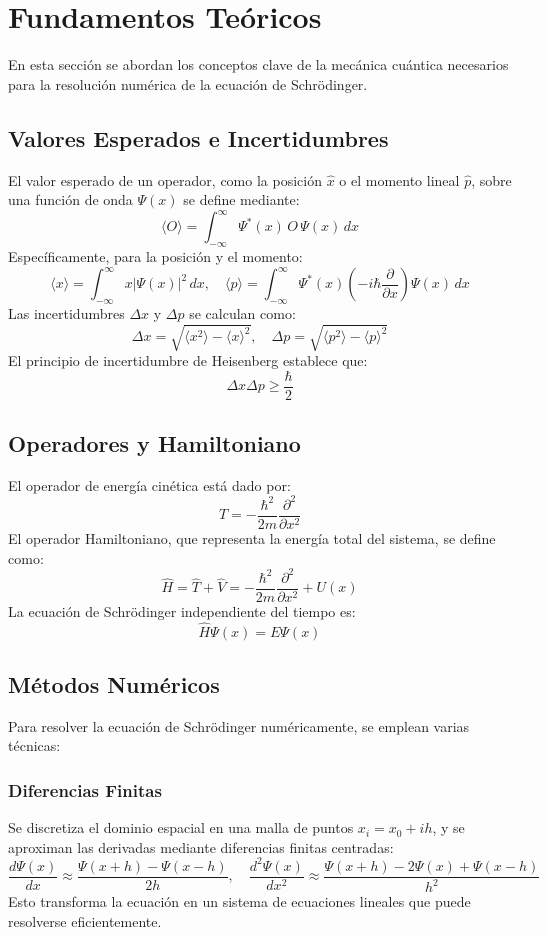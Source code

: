 \documentclass[a4paper,12pt]{article}
\begin{document}
\section{Fundamentos Teóricos}
En esta sección se abordan los conceptos clave de la mecánica cuántica necesarios para la resolución numérica de la ecuación de Schrödinger.

\subsection{Valores Esperados e Incertidumbres}
El valor esperado de un operador, como la posición $\hat{x}$ o el momento lineal $\hat{p}$, sobre una función de onda $\Psi(x)$ se define mediante:
\[
\langle O \rangle = \int_{-\infty}^{\infty} \Psi^*(x) \, O \, \Psi(x) \, dx
\]
Específicamente, para la posición y el momento:
\[
\langle x \rangle = \int_{-\infty}^{\infty} x |\Psi(x)|^2 \, dx, \quad \langle p \rangle = \int_{-\infty}^{\infty} \Psi^*(x) \left( -i\hbar \frac{\partial}{\partial x} \right) \Psi(x) \, dx
\]
Las incertidumbres $\Delta x$ y $\Delta p$ se calculan como:
\[
\Delta x = \sqrt{\langle x^2 \rangle - \langle x \rangle^2}, \quad \Delta p = \sqrt{\langle p^2 \rangle - \langle p \rangle^2}
\]
El principio de incertidumbre de Heisenberg establece que:
\[
\Delta x \Delta p \geq \frac{\hbar}{2}
\]

\subsection{Operadores y Hamiltoniano}
El operador de energía cinética está dado por:
\[
\hat{T} = -\frac{\hbar^2}{2m} \frac{\partial^2}{\partial x^2}
\]
El operador Hamiltoniano, que representa la energía total del sistema, se define como:
\[
\hat{H} = \hat{T} + \hat{V} = -\frac{\hbar^2}{2m} \frac{\partial^2}{\partial x^2} + U(x)
\]
La ecuación de Schrödinger independiente del tiempo es:
\[
\hat{H} \Psi(x) = E \Psi(x)
\]

\subsection{Métodos Numéricos}
Para resolver la ecuación de Schrödinger numéricamente, se emplean varias técnicas:

\subsubsection{Diferencias Finitas}
Se discretiza el dominio espacial en una malla de puntos $x_i = x_0 + i h$, y se aproximan las derivadas mediante diferencias finitas centradas:
\[
\frac{d\Psi(x)}{dx} \approx \frac{\Psi(x+h) - \Psi(x-h)}{2h}, \quad \frac{d^2 \Psi(x)}{dx^2} \approx \frac{\Psi(x+h) - 2\Psi(x) + \Psi(x-h)}{h^2}
\]
Esto transforma la ecuación en un sistema de ecuaciones lineales que puede resolverse eficientemente.
\end{document}
